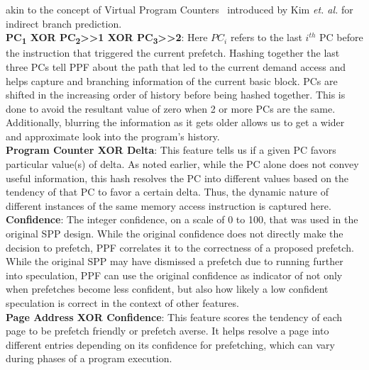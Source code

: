 akin to the concept of Virtual Program Counters~\cite{VPC} introduced by Kim
\textit{et. al.} for indirect branch prediction. \\
%
\textbf{PC\textsubscript{1} XOR PC\textsubscript{2}>>1 XOR
PC\textsubscript{3}>>2}: Here $PC_i$ refers to the last $i^{th}$
PC before the instruction that triggered the current prefetch.
Hashing together the last three PCs tell PPF about the path that led
to the current demand access and helps capture and branching
information of the current basic block.  PCs are shifted in the
increasing order of history before being hashed together.  This is
done to avoid the resultant value of zero when 2 or more PCs are the
same.  Additionally, blurring the information as it gets older
allows us to get a wider and approximate look into the program's
history. \\
%
\textbf{Program Counter XOR Delta}: This feature tells us if a given PC favors
particular value(s) of delta.  As noted earlier, while the PC alone does not
convey useful information, this hash resolves the PC into different values
based on the tendency of that PC to favor a certain delta.  Thus, the dynamic
nature of different instances of the same memory access instruction is
captured here. \\
%
%
\textbf{Confidence}: The integer confidence, on a scale of 0 to 100, that was
used in the original SPP design. While the original confidence does not
directly make the decision to prefetch, PPF correlates it to the correctness
of a proposed prefetch.  While the original SPP may have dismissed a prefetch
due to running further into speculation, PPF can use the original confidence
as indicator of not only when prefetches become less confident, but also how
likely a low confident speculation is correct in the context of other
features. \\
\textbf{Page Address XOR Confidence}: This feature scores the tendency of each
page to be prefetch friendly or prefetch averse. It helps resolve a page into
different entries depending on its confidence for prefetching, which can vary
during phases of a program execution. \\
